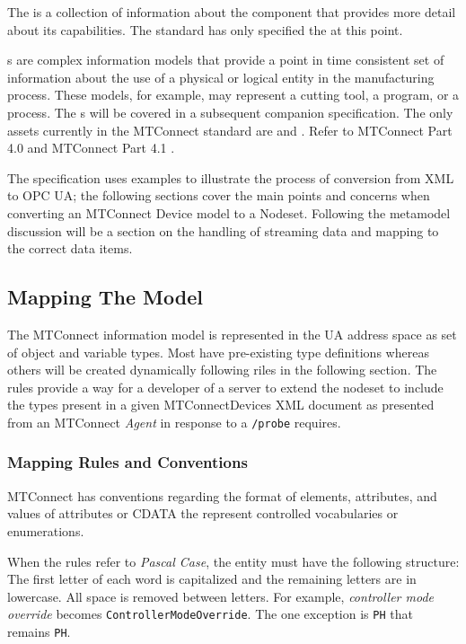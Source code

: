 The  is a collection of information about the component that provides more detail about its capabilities. The standard has only specified the  at this point.

s are complex information models that provide a point in time consistent set of information about the use of a physical or logical entity in the manufacturing process. These models, for example, may represent a cutting tool, a program, or a process. The s will be covered in a subsequent companion specification. The only assets currently in the MTConnect standard are  and . Refer to MTConnect Part 4.0 \cite{MTCPart40} and MTConnect Part 4.1 \cite{MTCPart41}.

The specification uses examples to illustrate the process of conversion from XML to OPC UA; the following sections cover the main points and concerns when converting an MTConnect Device model to a Nodeset. Following the metamodel discussion will be a section on the handling of streaming data and mapping to the correct data items. 

\subsection{Mapping The Model}
\lstset{language=XML,numbers=left,xleftmargin=2em}

The MTConnect information model is represented in the UA address space as set of object and variable types. Most have pre-existing type definitions whereas others will be created dynamically following riles in the following section. The rules provide a way for a developer of a server to extend the nodeset to include the types present in a given MTConnectDevices XML document as presented from an MTConnect \textit{Agent} in response to a \texttt{/probe} requires.

\subsubsection{Mapping Rules and Conventions}

MTConnect has conventions regarding the format of elements, attributes, and values of attributes or CDATA the represent controlled vocabularies or enumerations. 

When the rules refer to \textit{Pascal Case}, the entity must have the following structure: The first letter of each word is capitalized and the remaining letters are in lowercase. All space is removed between letters. For example, \textit{controller mode override} becomes \texttt{Controller\-Mode\-Override}. The one exception is \texttt{PH} that remains \texttt{PH}.

